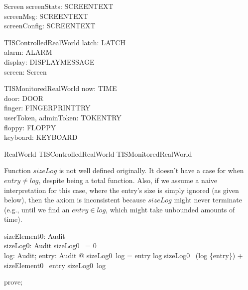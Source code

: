 \begin{schema}{Screen}
  screenStats: SCREENTEXT\\
  screenMsg: SCREENTEXT\\
  screenConfig: SCREENTEXT
\end{schema}

\begin{schema}{TISControlledRealWorld}
  latch: LATCH\\
  alarm: ALARM\\
  display: DISPLAYMESSAGE\\
  screen: Screen
\end{schema}

\begin{schema}{TISMonitoredRealWorld}
  now: TIME\\
  door: DOOR\\
  finger: FINGERPRINTTRY\\
  userToken, adminToken: TOKENTRY\\
  floppy: FLOPPY\\
  keyboard: KEYBOARD
\end{schema}

\begin{zed}
RealWorld  TISControlledRealWorld \land  TISMonitoredRealWorld
\end{zed}

Function $sizeLog$ is not well defined originally. It doesn't have
a case for when $entry \neq log$, despite being a total function.
Also, if we assume a naive interpretation for this case, where the
entry's size is simply ignored (as given below), then the axiom is
inconsistent because $sizeLog$ might never terminate (e.g., until we
find an $entry \in log$, which might take unbounded amounts of time).
%
\begin{axdef}
  sizeElement0: Audit \fun  \nat \\
  sizeLog0: \finset  Audit \fun  \nat
\where
   sizeLog0~ \emptyset = 0\\
    \forall log: \finset Audit; entry: Audit @ sizeLog0~log =
        \IF entry \in log \THEN sizeLog0~ (log \setminus \{entry\}) + sizeElement0~ entry
        \ELSE sizeLog0~log
\end{axdef}

\begin{zproof}
prove;
\end{zproof}


